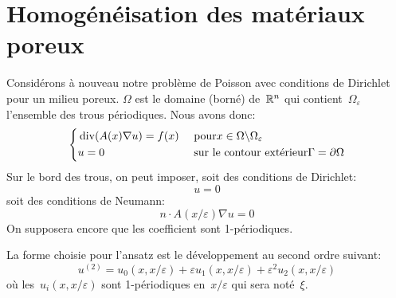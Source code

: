 \section{Homogénéisation des matériaux poreux}
Considérons à nouveau notre problème de Poisson avec conditions de Dirichlet pour un milieu
poreux.
$\Omega$ est le domaine (borné) de~$\mathbb R^n$ qui contient~$\Omega_\varepsilon$ l'ensemble des trous
périodiques.
Nous avons donc:
\begin{equation}
\left\{
\begin{aligned}
&\operatorname{div}(A(x)\nabla u) = f(x) &&\text{ pour} x\in\Omega\backslash\Omega_\varepsilon\\
&u=0 && \text{ sur le contour extérieur} \Gamma=\partial\Omega\\
\end{aligned}
\right.
\end{equation}
Sur le bord des trous, on peut imposer, soit des conditions de Dirichlet:
\begin{equation}u=0 \end{equation}
soit des conditions de Neumann:
\begin{equation}n\cdot A(x/\varepsilon)\nabla u=0 \end{equation}
On supposera encore que les coefficient sont 1-périodiques.

\medskip
{}

La forme choisie pour l'ansatz est le développement au second ordre suivant:
\begin{equation}u^{(2)} = u_0(x,x/\varepsilon)+\varepsilon u_1(x,x/\varepsilon) + \varepsilon^2 u_2(x,x/\varepsilon)\end{equation}
où les~$u_i(x,x/\varepsilon)$ sont 1-périodiques en~$x/\varepsilon$ qui sera noté~$\xi$.

